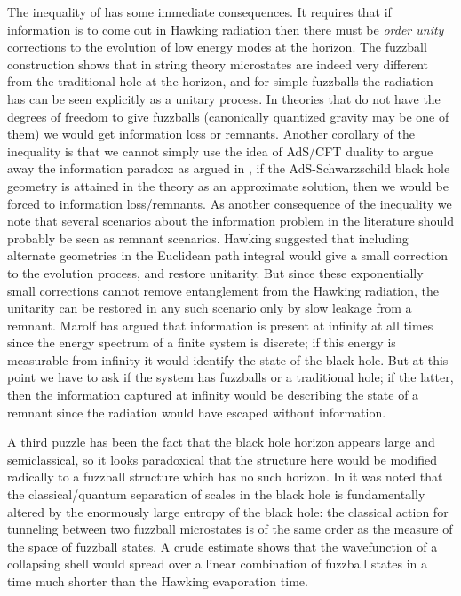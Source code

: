 \documentclass[11pt]{article}
\begin{document}
The inequality of \cite{mathurfuzz} has some immediate consequences. It requires that if information is to come out in Hawking radiation then there must be {\it order unity} corrections to the evolution of low energy modes at the horizon. The fuzzball construction shows that in string theory microstates are indeed very different from the traditional hole at the horizon, and for simple fuzzballs the radiation has can be seen explicitly as a unitary process. In theories that do not have the degrees of freedom to give fuzzballs (canonically quantized gravity may be one of them) we would get information loss or remnants. Another corollary of the inequality is that we cannot simply use the idea of AdS/CFT duality to argue away the information paradox: as argued in  \cite{mathurfuzz,mathurrecent}, if the AdS-Schwarzschild black hole geometry is attained in the theory as an approximate solution, then we would be forced to information loss/remnants. As another consequence of the inequality we note that several scenarios about the information problem in the literature should probably be seen as remnant scenarios. Hawking \cite{hawkingreverse} suggested that including alternate geometries in the Euclidean path integral would give a small correction to the evolution process, and restore unitarity. But since these exponentially small corrections cannot remove entanglement from the Hawking radiation, the unitarity can be restored in any such scenario only by slow leakage from a remnant. Marolf \cite{marolf} has argued that information is present at infinity at all times since the energy spectrum of a finite system is discrete; if  this energy is measurable from infinity it would identify the state of the black hole. But at this point we have to ask if the system has fuzzballs or a  traditional hole; if the latter,  then the information captured at infinity would be describing the state of a remnant since the radiation would have escaped without information. 


A third puzzle has been the fact that the black hole horizon appears large and semiclassical, so it looks paradoxical that the structure here would be modified radically to a fuzzball structure which has no such horizon. In \cite{tunnel} it was noted that the classical/quantum separation of scales in the black hole is fundamentally altered by  the enormously large entropy of the black hole: the classical action for tunneling between two fuzzball microstates is of the same order as the measure of the space of fuzzball states. A crude estimate \cite{time} shows that the wavefunction of a  collapsing shell would spread over a linear combination of fuzzball states in a time much shorter than the Hawking evaporation time. 
\end{document}
